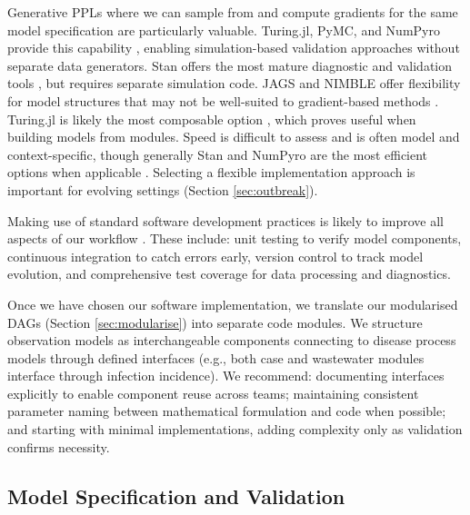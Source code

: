\documentclass{article}
\begin{document}
Generative PPLs where we can sample from and compute gradients for the same model specification are particularly valuable.
Turing.jl, PyMC, and NumPyro provide this capability \citep{ge2018turing,fjelde2025turing,abril2023pymc,phan2019composable}, enabling simulation-based validation approaches without separate data generators.
Stan offers the most mature diagnostic and validation tools \citep{carpenter2017stan} , but requires separate simulation code.
JAGS and NIMBLE offer flexibility for model structures that may not be well-suited to gradient-based methods \citep{plummer2003jags,valpine2017programming}.
Turing.jl is likely the most composable option \citep{ge2018turing}, which proves useful when building models from modules.
Speed is difficult to assess and is often model and context-specific, though generally Stan and NumPyro are the most efficient options when applicable \citep{carpenter2017stan,phan2019composable}.
Selecting a flexible implementation approach is important for evolving settings (Section \ref{sec:outbreak}).

Making use of standard software development practices is likely to improve all aspects of our workflow \citep{gelman2020bayesian}.
These include: unit testing to verify model components, continuous integration to catch errors early, version control to track model evolution, and comprehensive test coverage for data processing and diagnostics.


Once we have chosen our software implementation, we translate our modularised DAGs (Section \ref{sec:modularise}) into separate code modules.
We structure observation models as interchangeable components connecting to disease process models through defined interfaces (e.g., both case and wastewater modules interface through infection incidence). We recommend: documenting interfaces explicitly to enable component reuse across teams; maintaining consistent parameter naming between mathematical formulation and code when possible; and starting with minimal implementations, adding complexity only as validation confirms necessity.

\subsection{Model Specification and Validation}\label{sec:spec-validate}
\end{document}
